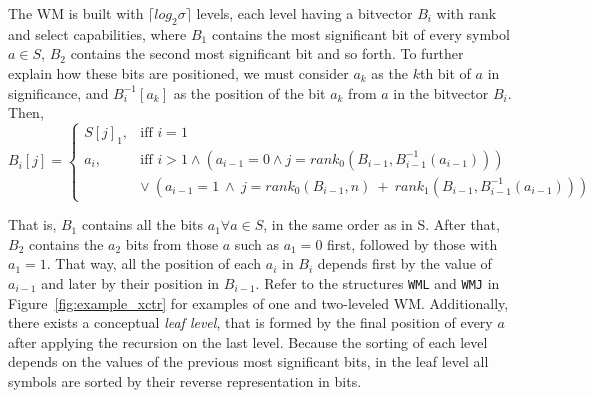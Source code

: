 \documentclass[runningheads]{llncs}
\begin{document}
The WM is built with $\lceil log_2\sigma\rceil$ levels, each level having a bitvector $B_i$ with rank and select capabilities, where $B_1$ contains the most significant bit of every symbol $a \in S$, $B_2$ contains the second most significant bit and so forth. To further explain how these bits are positioned, we must consider $a_k$ as the $k$th bit of $a$ in significance, and $B^{-1}_i[a_k]$ as the position of the bit $a_k$ from $a$ in the bitvector $B_i$. Then, 
\[
    B_i[j] = \left\{\begin{array}{lr}
        S[j]_1, & \text{iff } i=1\\
        a_i, & \text{iff } i>1 \wedge (a_{i-1}=0 \wedge j=rank_0(B_{i-1},B^{-1}_{i-1}(a_{i-1}))) \\
        & \vee~(a_{i-1}=1~\wedge~j=rank_0(B_{i-1},n)~+~rank_1(B_{i-1},B^{-1}_{i-1}(a_{i-1})))
        \end{array}\right.
\]

That is, $B_1$ contains all the bits $a_1 \forall a \in S$, in the same order as in S. After that, $B_2$ contains the $a_2$ bits from those $a$ such as $a_1 = 0$ first, followed by those with $a_1 = 1$. That way, all the position of each $a_i$ in $B_i$ depends first by the value of $a_{i-1}$ and later by their position in $B_{i-1}$. Refer to the structures \texttt{WML} and \texttt{WMJ} in Figure~\ref{fig:example_xctr} for examples of one and two-leveled WM. Additionally, there exists a conceptual \textit{leaf level}, that is formed by the final position of every $a$ after applying the recursion on the last level. Because the sorting of each level depends on the values of the previous most significant bits, in the leaf level all symbols are sorted by their reverse representation in bits.
\end{document}
